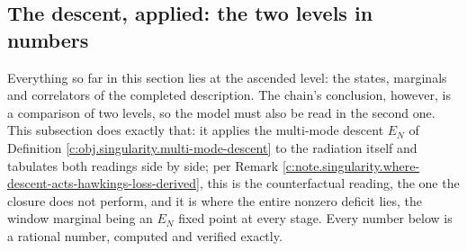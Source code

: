 \documentclass[11pt]{article}
\theoremstyle{definition}
\theoremstyle{plain}
\providecommand{\EN}{}\renewcommand{\EN}{E_{N}}
\begin{document}
\subsection*{The descent, applied: the two levels in numbers}
\label{c:note.singularity.setting-descent-applied-two-levels-numbers}
Everything so far in this section lies at the ascended level: the states, marginals and correlators of the completed description. The chain's conclusion, however, is a comparison of two levels, so the model must also be read in the second one. This subsection does exactly that: it applies the multi-mode descent $\EN$ of Definition \ref{c:obj.singularity.multi-mode-descent} to the radiation itself and tabulates both readings side by side; per Remark \ref{c:note.singularity.where-descent-acts-hawkings-loss-derived}, this is the counterfactual reading, the one the closure does not perform, and it is where the entire nonzero deficit lies, the window marginal being an $\EN$ fixed point at every stage. Every number below is a rational number, computed and verified exactly.
\end{document}
